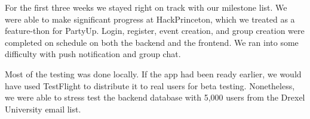 \documentclass[12pt]{article}
\begin{document}
\bigskip

For the first three weeks we stayed right on track with our milestone list. We were able to make significant progress at HackPrinceton, which we treated as a feature-thon for PartyUp. Login, register, event creation, and group creation were completed on schedule on both the backend and the frontend. We ran into some difficulty with push notification and group chat. 

\bigskip

Most of the testing was done locally. If the app had been ready earlier, we would have used TestFlight to distribute it to real users for beta testing. Nonetheless, we were able to stress test the backend database with 5,000 users from the Drexel University email list.
\end{document}
